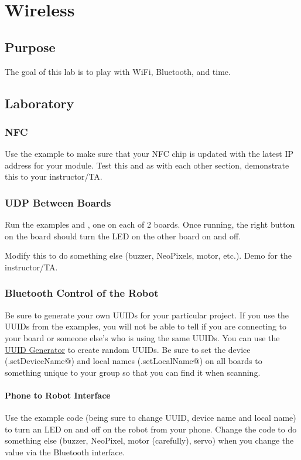 \chapter{Wireless}

\section{Purpose}
The goal of this lab is to play with WiFi, Bluetooth, and time.

\section{Laboratory}
\subsection{NFC}
Use the example to make sure that your NFC chip is updated with the latest
IP address for your module. Test this and as with each other section, 
demonstrate this to your instructor/TA.

\subsection{UDP Between Boards}
Run the examples \lstinline@@ and \lstinline@@, one on each of 2 boards. Once
running, the right button on the \lstinline@@ board should turn the LED on the 
other board on and off.

Modify this to do something else (buzzer, NeoPixels, motor, etc.). Demo for the 
instructor/TA.

\subsection{Bluetooth Control of the Robot}
Be sure to generate your own UUIDs for your particular project. If you use
the UUIDs from the examples, you will not be able to tell if you are connecting
to your board or someone else's who is using the same UUIDs. You can use the 
\href{https://www.uuidgenerator.net/}{UUID Generator} to create random UUIDs.
Be sure to set the device (\lstinline@BLE.setDeviceName@) and local names 
(\lstinline@BLE.setLocalName@) on all boards to something unique to 
your group so that you can find it when scanning.

\subsubsection{Phone to Robot Interface}
Use the example code (being sure to change UUID, device name and local name)
to turn an LED on and off on the robot from your phone. Change the code to 
do something else (buzzer, NeoPixel, motor (carefully), servo) when you change 
the value via the Bluetooth interface. 


